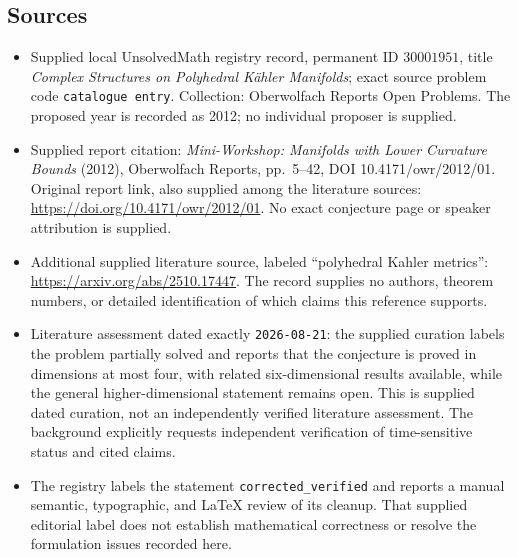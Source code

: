 \documentclass[11pt]{article}
\begin{document}
\subsection{Sources}
\begin{itemize}
\item Supplied local UnsolvedMath registry record, permanent ID \(30001951\), title \emph{Complex Structures on Polyhedral K\"ahler Manifolds}; exact source problem code \texttt{catalogue entry}. Collection: Oberwolfach Reports Open Problems. The proposed year is recorded as 2012; no individual proposer is supplied.
\item Supplied report citation: \emph{Mini-Workshop: Manifolds with Lower Curvature Bounds} (2012), Oberwolfach Reports, pp.\ 5--42, DOI 10.4171/owr/2012/01. Original report link, also supplied among the literature sources: \url{https://doi.org/10.4171/owr/2012/01}. No exact conjecture page or speaker attribution is supplied.
\item Additional supplied literature source, labeled ``polyhedral Kahler metrics'': \url{https://arxiv.org/abs/2510.17447}. The record supplies no authors, theorem numbers, or detailed identification of which claims this reference supports.
\item Literature assessment dated exactly \texttt{2026-08-21}: the supplied curation labels the problem partially solved and reports that the conjecture is proved in dimensions at most four, with related six-dimensional results available, while the general higher-dimensional statement remains open. This is supplied dated curation, not an independently verified literature assessment. The background explicitly requests independent verification of time-sensitive status and cited claims.
\item The registry labels the statement \texttt{corrected\_verified} and reports a manual semantic, typographic, and LaTeX review of its cleanup. That supplied editorial label does not establish mathematical correctness or resolve the formulation issues recorded here.
\end{itemize}
\end{document}
